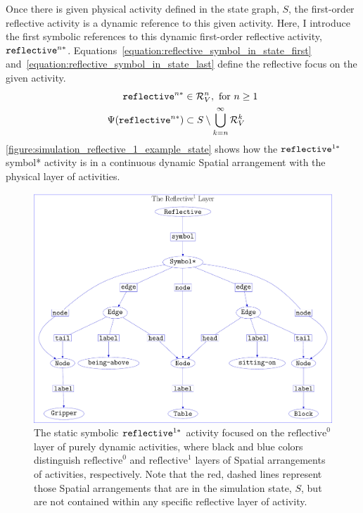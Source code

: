 Once there is given physical activity defined in the state graph, $S$,
the first-order reflective activity is a dynamic reference to this
given activity.  Here, I introduce the first symbolic references to
this dynamic first-order reflective activity,
$\text{\tt{reflective}}^{n*}$.
{\mbox{Equations~\ref{equation:reflective_symbol_in_state_first}}}
{\mbox{and~\ref{equation:reflective_symbol_in_state_last}}} define the
reflective focus on the given activity.
\begin{align}
\label{equation:reflective_symbol_in_state_first}
      \text{\tt{reflective}}^{n*} &\in \mathcal{R}^n_V, \text{~for $n \geq 1$} \\
\label{equation:reflective_symbol_in_state_last}
\Psi(\text{\tt{reflective}}^{n*}) &\subset S \setminus \bigcup_{k=n}^\infty\mathcal{R}^k_V
\end{align}
{\mbox{\autoref{figure:simulation_reflective_1_example_state}}} shows
how the $\text{\tt reflective}^{1*}$ symbol* activity is in a
continuous dynamic Spatial arrangement with the physical layer of
activities.
\begin{figure}
\center
\includegraphics[width=12cm]{gfx/simulation_reflective_1_example_state}
\caption[The static symbolic $\text{\tt reflective}^{1*}$ activity
  focused on the $\text{reflective}^0$ layer of purely dynamic
  activities.]{The static symbolic $\text{\tt reflective}^{1*}$
  activity focused on the $\text{reflective}^0$ layer of purely
  dynamic activities, where black and blue colors distinguish
  $\text{reflective}^0$ and $\text{reflective}^1$ layers of Spatial
  arrangements of activities, respectively.  Note that the red, dashed
  lines represent those Spatial arrangements that are in the
  simulation state, $S$, but are not contained within any specific
  reflective layer of activity.}
\label{figure:simulation_reflective_1_example_state}
\end{figure}


